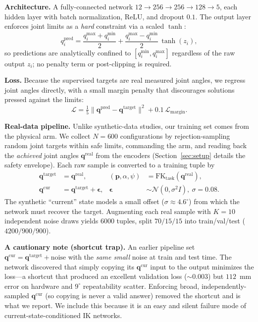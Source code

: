 \documentclass[conference]{IEEEtran}
\begin{document}
\textbf{Architecture.} A fully-connected network $12\!\to\!256\!\to\!256\!\to\!128\!\to\!5$, each hidden layer with batch normalization, ReLU, and dropout $0.1$. The output layer enforces joint limits as a \emph{hard} constraint via a scaled $\tanh$:
\begin{equation}
q_i^{\mathrm{pred}} = \frac{q_i^{\max}+q_i^{\min}}{2} + \frac{q_i^{\max}-q_i^{\min}}{2}\,\tanh(z_i),
\label{eq:tanh}
\end{equation}
so predictions are analytically confined to $[q_i^{\min}, q_i^{\max}]$ regardless of the raw output $z_i$; no penalty term or post-clipping is required.

\textbf{Loss.} Because the supervised targets are real measured joint angles, we regress joint angles directly, with a small margin penalty that discourages solutions pressed against the limits:
\begin{equation}
\mathcal{L} = \tfrac{1}{5}\|\mathbf{q}^{\mathrm{pred}}-\mathbf{q}^{\mathrm{target}}\|^2 + 0.1\,\mathcal{L}_{\mathrm{margin}}.
\end{equation}

\textbf{Real-data pipeline.} Unlike synthetic-data studies, our training set comes from the physical arm. We collect $N{=}600$ configurations by rejection-sampling random joint targets within safe limits, commanding the arm, and reading back the \emph{achieved} joint angles $\mathbf{q}^{\mathrm{real}}$ from the encoders (Section~\ref{sec:setup} details the safety envelope). Each raw sample is converted to a training tuple by
\begin{align}
\mathbf{q}^{\mathrm{target}} &= \mathbf{q}^{\mathrm{real}}, &
(\mathbf{p},\alpha,\psi) &= \mathrm{FK}_{\mathrm{task}}(\mathbf{q}^{\mathrm{real}}), \nonumber\\
\mathbf{q}^{\mathrm{cur}} &= \mathbf{q}^{\mathrm{target}} + \boldsymbol{\epsilon}, & \boldsymbol{\epsilon}&\sim\mathcal{N}(0,\sigma^2 I),\ \sigma{=}0.08.
\end{align}
The synthetic ``current'' state models a small offset ($\sigma\!\approx\!4.6^{\circ}$) from which the network must recover the target. Augmenting each real sample with $K{=}10$ independent noise draws yields $6000$ tuples, split $70/15/15$ into train/val/test ($4200/900/900$).

\textbf{A cautionary note (shortcut trap).} An earlier pipeline set $\mathbf{q}^{\mathrm{cur}}=\mathbf{q}^{\mathrm{target}}+\text{noise}$ with the \emph{same small} noise at train and test time. The network discovered that simply copying its $\mathbf{q}^{\mathrm{cur}}$ input to the output minimizes the loss---a shortcut that produced an excellent validation loss ($\sim\!0.003$) but $112$~mm error on hardware and $9^{\circ}$ repeatability scatter. Enforcing broad, independently-sampled $\mathbf{q}^{\mathrm{cur}}$ (so copying is never a valid answer) removed the shortcut and is what we report. We include this because it is an easy and silent failure mode of current-state-conditioned IK networks.
\end{document}
